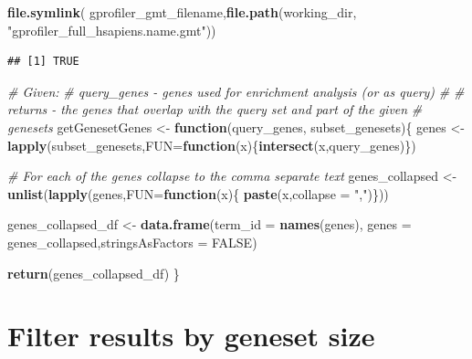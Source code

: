 \documentclass[
]{book}
\newenvironment{Shaded}{\begin{snugshade}}{\end{snugshade}}
\newcommand{\AttributeTok}[1]{\textcolor[rgb]{0.13,0.29,0.53}{#1}}
\newcommand{\CommentTok}[1]{\textcolor[rgb]{0.56,0.35,0.01}{\textit{#1}}}
\newcommand{\ConstantTok}[1]{\textcolor[rgb]{0.56,0.35,0.01}{#1}}
\newcommand{\ControlFlowTok}[1]{\textcolor[rgb]{0.13,0.29,0.53}{\textbf{#1}}}
\newcommand{\FunctionTok}[1]{\textcolor[rgb]{0.13,0.29,0.53}{\textbf{#1}}}
\newcommand{\NormalTok}[1]{#1}
\newcommand{\OtherTok}[1]{\textcolor[rgb]{0.56,0.35,0.01}{#1}}
\newcommand{\StringTok}[1]{\textcolor[rgb]{0.31,0.60,0.02}{#1}}
\begin{document}
\begin{Shaded}
\begin{Highlighting}[]
\FunctionTok{file.symlink}\NormalTok{( gprofiler\_gmt\_filename,}\FunctionTok{file.path}\NormalTok{(working\_dir, }
                                   \StringTok{"gprofiler\_full\_hsapiens.name.gmt"}\NormalTok{))}
\end{Highlighting}
\end{Shaded}

\begin{verbatim}
## [1] TRUE
\end{verbatim}

\begin{Shaded}
\begin{Highlighting}[]
\CommentTok{\# Given:}
\CommentTok{\# query\_genes {-} genes used for enrichment analysis (or as query)}
\CommentTok{\#}
\CommentTok{\# returns {-} the genes that overlap with the query set and part of the given}
\CommentTok{\#           genesets}
\NormalTok{getGenesetGenes }\OtherTok{\textless{}{-}} \ControlFlowTok{function}\NormalTok{(query\_genes, subset\_genesets)\{}
\NormalTok{  genes }\OtherTok{\textless{}{-}} \FunctionTok{lapply}\NormalTok{(subset\_genesets,}\AttributeTok{FUN=}\ControlFlowTok{function}\NormalTok{(x)\{}\FunctionTok{intersect}\NormalTok{(x,query\_genes)\})}
  
  \CommentTok{\# For each of the genes collapse to the comma separate text}
\NormalTok{  genes\_collapsed }\OtherTok{\textless{}{-}} \FunctionTok{unlist}\NormalTok{(}\FunctionTok{lapply}\NormalTok{(genes,}\AttributeTok{FUN=}\ControlFlowTok{function}\NormalTok{(x)\{}
                                                \FunctionTok{paste}\NormalTok{(x,}\AttributeTok{collapse =} \StringTok{","}\NormalTok{)\}))}
  
\NormalTok{  genes\_collapsed\_df }\OtherTok{\textless{}{-}} \FunctionTok{data.frame}\NormalTok{(}\AttributeTok{term\_id =} \FunctionTok{names}\NormalTok{(genes), }
                            \AttributeTok{genes =}\NormalTok{ genes\_collapsed,}\AttributeTok{stringsAsFactors =} \ConstantTok{FALSE}\NormalTok{)}
  
  \FunctionTok{return}\NormalTok{(genes\_collapsed\_df)}
\NormalTok{\}}
\end{Highlighting}
\end{Shaded}

\section{Filter results by geneset size}\label{filter-results-by-geneset-size}
\end{document}
